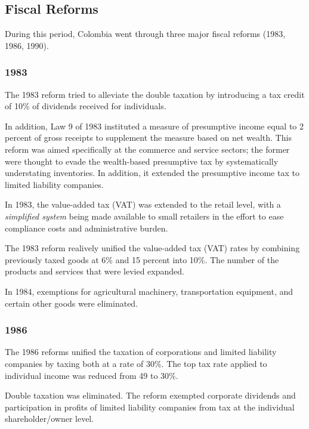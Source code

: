 \documentclass[
  12pt]{article}
\begin{document}
\hypertarget{fiscal-reforms}{%
\subsection{Fiscal Reforms}\label{fiscal-reforms}}

During this period, Colombia went through three major fiscal reforms
(1983, 1986, 1990).

\hypertarget{section}{%
\subsubsection{1983}\label{section}}

The 1983 reform tried to alleviate the double taxation by introducing a
tax credit of 10\% of dividends received for individuals.

In addition, Law 9 of 1983 instituted a measure of presumptive income
equal to 2 percent of gross receipts to supplement the measure based on
net wealth. This reform was aimed specifically at the commerce and
service sectors; the former were thought to evade the wealth-based
presumptive tax by systematically understating inventories. In addition,
it extended the presumptive income tax to limited liability companies.

In 1983, the value-added tax (VAT) was extended to the retail level,
with a \emph{simplified system} being made available to small retailers
in the effort to ease compliance costs and administrative burden.

The 1983 reform realively unified the value-added tax (VAT) rates by
combining previously taxed goods at 6\% and 15 percent into 10\%. The
number of the products and services that were levied expanded.

In 1984, exemptions for agricultural machinery, transportation
equipment, and certain other goods were eliminated.

\hypertarget{section-1}{%
\subsubsection{1986}\label{section-1}}

The 1986 reforms unified the taxation of corporations and limited
liability companies by taxing both at a rate of 30\%. The top tax rate
applied to individual income was reduced from 49 to 30\%.

Double taxation was eliminated. The reform exempted corporate dividends
and participation in profits of limited liability companies from tax at
the individual shareholder/owner level.
\end{document}
